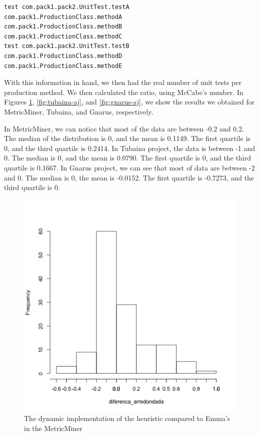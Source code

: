 \documentclass{sig-alternate}
\begin{document}
\begin{lstlisting}
test com.pack1.pack2.UnitTest.testA
com.pack1.ProductionClass.methodA
com.pack1.ProductionClass.methodB
com.pack1.ProductionClass.methodC
test com.pack1.pack2.UnitTest.testB
com.pack1.ProductionClass.methodD
com.pack1.ProductionClass.methodE
\end{lstlisting}

With this information in hand, we then had the real number of unit tests per production method. We then
calculated the ratio, using McCabe's number. In Figures \ref{fig:metricminer-aj}, \ref{fig:tubaina-aj}, and
\ref{fig:gnarus-aj}, we show the results we obtained for MetricMiner, Tubaina, and Gnarus, respectively. 

In MetricMiner, we can notice that most of the data are between -0.2 and 0.2. 
The median of the distribution is 0, and the mean is 0.1149. The first quartile is 0, and the
third quartile is 0.2414.
In Tubaina project, the data is between
-1 and 0. The median is 0, and the mean is 0.0790. The first quartile is
0, and the third quartile is 0.1667. 
In Gnarus project, we can see that most of data
are between -2 and 0. The median is 0, the mean is -0.0152. The first quartile
is -0.7273, and the third quartile is 0.


\begin{figure}[h!H]
  \centering
  \includegraphics[scale=0.4]{../stats/metricminer-histograma-aspectj.png}
  \caption{The dynamic implementation of the heuristic compared to Emma's in the MetricMiner}
  \label{fig:metricminer-aj}
\end{figure}
\end{document}
